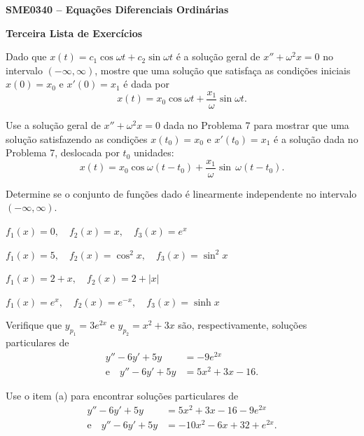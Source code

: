 \documentclass[oneside,12pt,a4paper]{report}
\begin{document}
    \begin{center}
        \fontsize{17.28}{17.28}
            \textbf{SME0340 -- Equações Diferenciais Ordinárias}

            \textbf{Terceira Lista de Exercícios}
    \end{center}


\begin{itensquestao}
    \item Dado que $x(t) = c_1 \cos \omega t + c_2 \sin \omega t$ é a solução geral
    de $x'' + \omega^2 x = 0$ no intervalo $(-\infty, \infty)$, mostre que uma solução
    que satisfaça as condições iniciais $x(0) = x_0$ e $x'(0) = x_1$ é dada por
    \[x(t) = x_0 \cos \omega t + \frac{x_1}{\omega} \sin \omega t.\]

    \item Use a solução geral de $x'' + \omega^2 x = 0$ dada no Problema 7 para
    mostrar que uma solução satisfazendo as condições $x(t_0) = x_0$ e
    $x'(t_0) = x_1$ é a solução dada no Problema 7, deslocada por $t_0$ unidades:
    \[x(t) = x_0 \cos \omega(t - t_0) + \frac{x_1}{\omega} \sin\, \omega(t - t_0).\]
\end{itensquestao}

 Determine se o conjunto de funções dado é
linearmente independente no intervalo $(-\infty, \infty)$.
\begin{itensquestao}[1]
    \item $f_1(x) = 0, \quad f_2(x) = x, \quad f_3(x) = e^x$
    \item $f_1(x) = 5, \quad f_2(x) = \cos^2 x, \quad f_3(x) = \sin^2 x$
    \item $f_1(x) = 2 + x, \quad f_2(x) = 2 + |x|$
    \item $f_1(x) = e^x, \quad f_2(x) = e^{-x}, \quad f_3(x) = \sinh x$
\end{itensquestao}

\begin{itensquestao}
\item Verifique que $y_{p_1} = 3e^{2x}$ e $y_{p_2} = x^2 + 3x$ são,
respectivamente, soluções particulares de
\begin{align*}
    y'' - 6y' + 5y &= -9e^{2x} \\
    \text{e} \quad y'' - 6y' + 5y &= 5x^2 + 3x - 16.
\end{align*}

\item Use o item (a) para encontrar soluções particulares de
\begin{align*}
    y'' - 6y' + 5y &= 5x^2 + 3x - 16 - 9e^{2x} \\
    \text{e} \quad y'' - 6y' + 5y &= -10x^2 - 6x + 32 + e^{2x}.
\end{align*}
\end{itensquestao}
\end{document}
